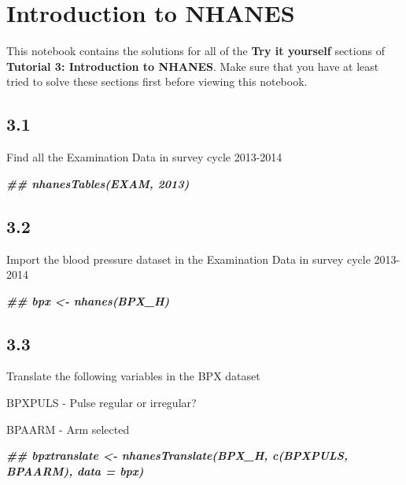 \documentclass[
]{book}
\newenvironment{Shaded}{\begin{snugshade}}{\end{snugshade}}
\newcommand{\DocumentationTok}[1]{\textcolor[rgb]{0.56,0.35,0.01}{\textbf{\textit{#1}}}}
\begin{document}
\hypertarget{introduction-to-nhanes-2}{%
\section{Introduction to NHANES}\label{introduction-to-nhanes-2}}

This notebook contains the solutions for all of the \textbf{Try it yourself} sections of \textbf{Tutorial 3: Introduction to NHANES}. Make sure that you have at least tried to solve these sections first before viewing this notebook.

\hypertarget{section-14}{%
\subsection{3.1}\label{section-14}}

Find all the Examination Data in survey cycle 2013-2014

\begin{Shaded}
\begin{Highlighting}[]
\DocumentationTok{\#\# nhanesTables(\textquotesingle{}EXAM\textquotesingle{}, 2013)}
\end{Highlighting}
\end{Shaded}

\hypertarget{section-15}{%
\subsection{3.2}\label{section-15}}

Import the blood pressure dataset in the Examination Data in survey cycle 2013-2014

\begin{Shaded}
\begin{Highlighting}[]
\DocumentationTok{\#\# bpx \textless{}{-} nhanes(\textquotesingle{}BPX\_H\textquotesingle{})}
\end{Highlighting}
\end{Shaded}

\hypertarget{section-16}{%
\subsection{3.3}\label{section-16}}

Translate the following variables in the BPX dataset

BPXPULS - Pulse regular or irregular?

BPAARM - Arm selected

\begin{Shaded}
\begin{Highlighting}[]
\DocumentationTok{\#\# bpxtranslate \textless{}{-} nhanesTranslate(\textquotesingle{}BPX\_H\textquotesingle{},  c(\textquotesingle{}BPXPULS\textquotesingle{}, \textquotesingle{}BPAARM\textquotesingle{}), data = bpx)}
\end{Highlighting}
\end{Shaded}
\end{document}
